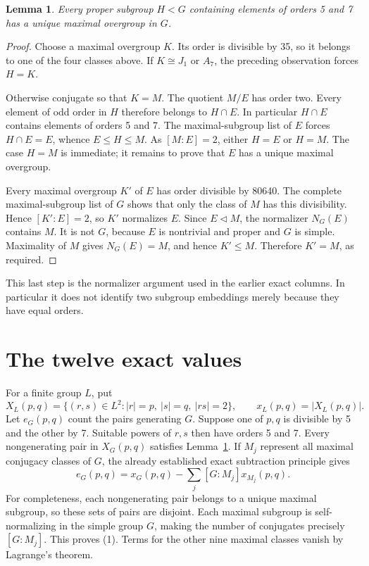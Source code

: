 \documentclass[11pt,a4paper]{article}
\newtheorem{lemma}{Lemma}\newtheorem{theorem}[lemma]{Theorem}
\begin{document}
\begin{lemma}\label{unique}
Every proper subgroup $H<G$ containing elements of orders 5 and 7
has a unique maximal overgroup in $G$.
\end{lemma}
\begin{proof}
Choose a maximal overgroup $K$. Its order is divisible by 35, so it
belongs to one of the four classes above. If $K\cong J_1$ or $A_7$,
the preceding observation forces $H=K$.

Otherwise conjugate so that $K=M$. The quotient $M/E$ has order two.
Every element of odd order in $H$ therefore belongs to $H\cap E$.
In particular $H\cap E$ contains elements of orders 5 and 7.
The maximal-subgroup list of $E$ forces $H\cap E=E$, whence
$E\leq H\leq M$. As $[M:E]=2$, either $H=E$ or $H=M$.
The case $H=M$ is immediate; it remains to prove that $E$ has a
unique maximal overgroup.

Every maximal overgroup $K'$ of $E$ has order divisible by 80640.
The complete maximal-subgroup list of $G$ shows that only the class
of $M$ has this divisibility. Hence $[K':E]=2$, so $K'$ normalizes
$E$. Since $E\lhd M$, the normalizer $N_G(E)$ contains $M$.
It is not $G$, because $E$ is nontrivial and proper and $G$ is simple.
Maximality of $M$ gives $N_G(E)=M$, and hence $K'\leq M$.
Therefore $K'=M$, as required.
\end{proof}
This last step is the normalizer argument used in the earlier exact
columns. In particular it does not identify two subgroup embeddings
merely because they have equal orders.

\section{The twelve exact values}
For a finite group $L$, put
\[
 X_L(p,q)=\{(r,s)\in L^2:|r|=p,\ |s|=q,\ |rs|=2\},
 \qquad x_L(p,q)=|X_L(p,q)|.
\]
Let $e_G(p,q)$ count the pairs generating $G$.
Suppose one of $p,q$ is divisible by 5 and the other by 7. Suitable
powers of $r,s$ then have orders 5 and 7. Every nongenerating pair
in $X_G(p,q)$ satisfies Lemma~\ref{unique}. If $M_j$ represent all
maximal conjugacy classes of $G$, the already established exact
subtraction principle gives
\[
 e_G(p,q)=x_G(p,q)-\sum_j [G:M_j]x_{M_j}(p,q).         \tag{1}
\]
For completeness, each nongenerating pair belongs to a unique
maximal subgroup, so these sets of pairs are disjoint. Each maximal
subgroup is self-normalizing in the simple group $G$, making the
number of conjugates precisely $[G:M_j]$. This proves (1).
Terms for the other nine maximal classes vanish by Lagrange's theorem.
\end{document}
